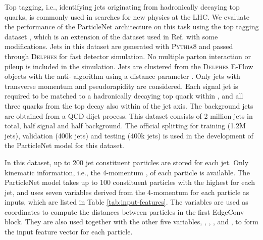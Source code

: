 \documentclass[aps,prd,longbibliography,reprint,amsmath,amssymb,amsfonts]{revtex4-1}
\begin{document}
Top tagging, i.e., identifying jets originating from hadronically decaying top quarks, is commonly used in searches for new physics at the LHC. We evaluate the performance of the ParticleNet architecture on this task using the top tagging dataset \cite{kasieczka_gregor_2019_2603256}, which is an extension of the dataset used in Ref. \cite{Butter:2017cot} with some modifications. Jets in this dataset are generated with \textsc{Pythia8} \cite{Sjostrand:2014zea} and passed through \textsc{Delphes} \cite{deFavereau:2013fsa} for fast detector simulation. No multiple parton interaction or pileup is included in the simulation. Jets are clustered from the \textsc{Delphes} E-Flow objects with the anti- algorithm \cite{Cacciari:2008gp} using a distance parameter . Only jets with transverse momentum  and pseudorapidity  are considered. Each signal jet is required to be matched to a hadronically decaying top quark within , and all three quarks from the top decay also within  of the jet axis. The background jets are obtained from a QCD dijet process. This dataset consists of 2 million jets in total, half signal and half background. The official splitting for training (1.2M jets), validation (400k jets) and testing (400k jets) is used in the development of the ParticleNet model for this dataset. 

In this dataset, up to 200 jet constituent particles are stored for each jet. Only kinematic information, i.e., the 4-momentum , of each particle is available. The ParticleNet model takes up to 100 constituent particles with the highest  for each jet, and uses seven variables derived from the 4-momentum for each particle as inputs, which are listed in Table \ref{tab:input-features}. The  variables are used as coordinates to compute the distances between particles in the first EdgeConv block. They are also used together with the other five variables, , , ,  and , to form the input feature vector for each particle. 
\end{document}
